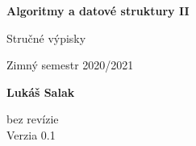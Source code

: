 \documentclass[11pt]{article}
\begin{document}
\begin{titlepage}
    \begin{center}
        \vspace*{1cm}
            
        \Huge
        \textbf{Algoritmy a datové struktury II}
            
        \vspace{0.5cm}
        \LARGE
        Stručné výpisky
        \\
        \vspace{5mm}
        
        Zimný semestr 2020/2021
        
        \vspace{1.5cm}
            
        \textbf{Lukáš Salak}
        
        \vfill
        \flushright
        \normalsize
        bez revízie\\
        Verzia 0.1\\

        
    \end{center}
\end{titlepage}

\tableofcontents
\clearpage








\end{document}
